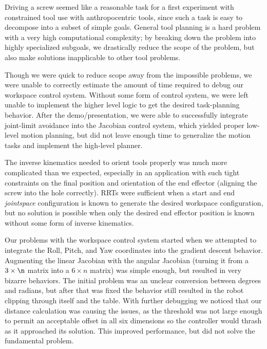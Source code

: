 \documentclass[10pt, conference]{IEEEtran}
\begin{document}
   Driving a screw seemed like a reasonable task for a first experiment
   with constrained tool use with anthropocentric tools, since such a
   task is easy to decompose into a subset of simple goals. General tool
   planning is a hard problem with a very high computational complexity;
   by breaking down the problem into highly specialized subgoals, we
   drastically reduce the scope of the problem, but also make solutions
   inapplicable to other tool problems.

   Though we were quick to reduce scope away from the impossible
   problems, we were unable to correctly estimate the amount of time
   required to debug our workspace control system.  Without some form of
   control system, we were left unable to implement the higher level
   logic to get the desired task-planning behavior. After the
   demo/presentation, we were able to successfully integrate joint-limit
   avoidance into the Jacobian control system, which yielded proper
   low-level motion planning, but did not leave enough time to
   generalize the motion tasks and implement the high-level planner.

   The inverse kinematics needed to orient tools properly was much more
   complicated than we expected, especially in an application with such
   tight constraints on the final position and orientation of the end
   effector (aligning the screw into the hole correctly). RRTs were
   sufficient when a start and end \emph{jointspace} configuration is
   known to generate the desired workspace configuration, but no
   solution is possible when only the desired end effector position is
   known without some form of inverse kinematics.

   Our problems with the workspace control system started when we
   attempted to integrate the Roll, Pitch, and Yaw coordinates into the
   gradient descent behavior. Augmenting the linear Jacobian with the
   angular Jacobian (turning it from a \(3 \times \n \) matrix into a
   \(6 \times n \) matrix) was simple enough, but resulted in very
   bizarre behaviors. The initial problem was an unclear conversion
   between degrees and radians, but after that was fixed the behavior
   still resulted in the robot clipping through itself and the
   table. With further debugging we noticed that our distance
   calculation was causing the issues, as the threshold was not large
   enough to permit an acceptable offset in all six dimensions so the
   controller would thrash as it approached its solution. This improved
   performance, but did not solve the fundamental problem.
\end{document}
